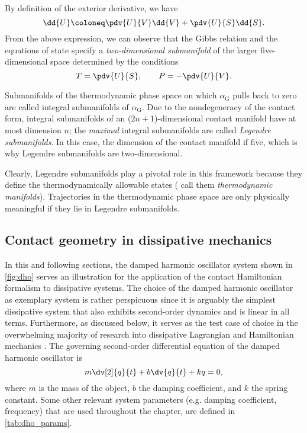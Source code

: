 By definition of the exterior derivative, we have
$$ \dd{U} \coloneq \pdv{U}{V}\dd{V} + \pdv{U}{S}\dd{S}.$$
From the above expression, we can observe that the Gibbs relation and the equations of state specify a \emph{two-dimensional submanifold} of the larger five-dimensional space determined by the conditions
\begin{equation}
    T = \pdv{U}{S}, \qquad P = -\pdv{U}{V}. 
\end{equation}

Submanifolds of the thermodynamic phase space on which $\alpha_\text{G}$ pulls back to zero are called integral submanifolds of $\alpha_\text{G}$. Due to the nondegeneracy of the contact form, integral submanifolds of an ($2n+1$)-dimensional contact manifold have at most dimension $n$; the \emph{maximal} integral submanifolds are called \emph{Legendre submanifolds}. In this case, the dimension of the contact manifold if five, which is why Legendre submanifolds are two-dimensional.

Clearly, Legendre submanifolds play a pivotal role in this framework because they define the thermodynamically allowable states (\citet{Balian2001} call them \emph{thermodynamic manifolds}). Trajectories in the thermodynamic phase space are only physically meaningful if they lie in Legendre submanifolds.

\subsection{Contact geometry in dissipative mechanics}
\label{ssec:contact_dissipative}
In this and following sections, the damped harmonic oscillator system shown in \cref{fig:dho} serves an illustration for the application of the contact Hamiltonian formalism to dissipative systems. The choice of the damped harmonic oscillator as exemplary system is rather perspicuous since it is arguably the simplest dissipative system that also exhibits second-order dynamics and is linear in all terms. Furthermore, as discussed below, it serves as the test case of choice in the overwhelming majority of research into dissipative Lagrangian and Hamiltonian mechanics \cite{Dekker1981,Hutters2020}. The governing second-order differential equation of the damped harmonic oscillator is
\begin{equation}  
    m\dv[2]{q}{t} + b\dv{q}{t} + kq = 0,
    \label{eq:dho_eom}
\end{equation}
where $m$ is the mass of the object, $b$ the damping coefficient, and $k$ the spring constant.  Some other relevant system parameters (e.g. damping coefficient, frequency) that are used throughout the chapter, are defined in \cref{tab:dho_params}. 

